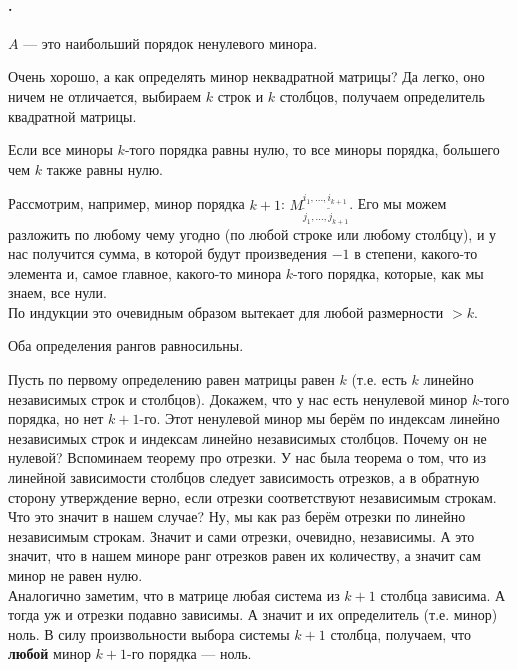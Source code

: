 \documentclass{article}
\begin{document}
    \paragraph{.}
    \begin{itemize}
        \dfn {} $A$ --- это наибольший порядок ненулевого минора.
        \begin{Comment}
            Очень хорошо, а как определять минор неквадратной матрицы? Да легко, оно ничем не отличается, выбираем $k$ строк и $k$ столбцов, получаем определитель квадратной матрицы.
        \end{Comment}
        \thm Если все миноры $k$-того порядка равны нулю, то все миноры порядка, большего чем $k$ также равны нулю.
        \begin{Proof}
            Рассмотрим, например, минор порядка $k+1$: $M_{\tilde j_1,\ldots,\tilde j_{k+1}}^{i_1,\ldots,i_{k+1}}$. Его мы можем разложить по любому чему угодно (по любой строке или любому столбцу), и у нас получится сумма, в которой будут произведения $-1$ в степени, какого-то элемента и, самое главное, какого-то минора $k$-того порядка, которые, как мы знаем, все нули.\\
            По индукции это очевидным образом вытекает для любой размерности $>k$.
        \end{Proof}
        \thm Оба определения рангов равносильны.
        \begin{Proof}
            Пусть по первому определению равен матрицы равен $k$ (т.е. есть $k$ линейно независимых строк и столбцов). Докажем, что у нас есть ненулевой минор $k$-того порядка, но нет $k+1$-го. Этот ненулевой минор мы берём по индексам линейно независимых строк и индексам линейно независимых столбцов. Почему он не нулевой? Вспоминаем теорему про отрезки. У нас была теорема о том, что из линейной зависимости столбцов следует зависимость отрезков, а в обратную сторону утверждение верно, если отрезки соответствуют независимым строкам. Что это значит в нашем случае? Ну, мы как раз берём отрезки по линейно независимым строкам. Значит и сами отрезки, очевидно, независимы. А это значит, что в нашем миноре ранг отрезков равен их количеству, а значит сам минор не равен нулю.\\
            Аналогично заметим, что в матрице любая система из $k+1$ столбца зависима. А тогда уж и отрезки подавно зависимы. А значит и их определитель (т.е. минор) ноль. В силу произвольности выбора системы $k+1$ столбца, получаем, что \textbf{любой} минор $k+1$-го порядка --- ноль.

\end{Proof}
\end{itemize}
\end{document}
